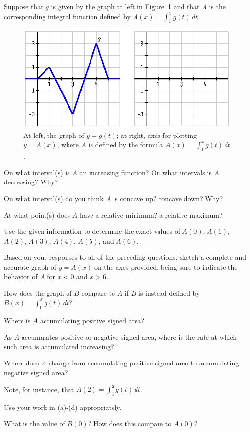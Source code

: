 \begin{activity} \label{A:5.1.3}  
Suppose that $g$ is given by the graph at left in Figure~\ref{F:5.1.Act3} and that $A$ is the corresponding integral function defined by $A(x) = \int_1^x g(t) \, dt$.
\begin{figure}[h]
\begin{center}
\includegraphics{figures/5_1_Act3.eps}
\caption{At left, the graph of $y = g(t)$; at right, axes for plotting $y = A(x)$, where $A$ is defined by the formula $A(x) = \int_1^x g(t) \, dt$.} \label{F:5.1.Act3}
\end{center}
\end{figure}
\ba
	\item On what interval(s) is $A$ an increasing function?  On what intervals is $A$ decreasing?  Why?
	\item On what interval(s) do you think $A$ is concave up?  concave down?  Why?
	\item At what point(s) does $A$ have a relative minimum?  a relative maximum?
	\item Use the given information to determine the exact values of $A(0)$, $A(1)$, $A(2)$, $A(3)$, $A(4)$, $A(5)$, and $A(6)$.
	\item Based on your responses to all of the preceding questions, sketch a complete and accurate graph of $y = A(x)$ on the axes provided, being sure to indicate the behavior of $A$ for $x < 0$ and $x > 6$.
	\item How does the graph of $B$ compare to $A$ if $B$ is instead defined by $B(x) = \int_0^x g(t) \, dt$?
\ea

\end{activity}
\begin{smallhint}
 \ba
	\item Where is $A$ accumulating positive signed area?	
	\item As $A$ accumulates positive or negative signed area, where is the rate at which such area is accumulated increasing?
	\item Where does $A$ change from accumulating positive signed area to accumulating negative signed area?
	\item Note, for instance, that $A(2) = \int_1^2 g(t) \, dt$.
	\item Use your work in (a)-(d) appropriately.
	\item What is the value of $B(0)$?  How does this compare to $A(0)$?
\ea
\end{smallhint}
